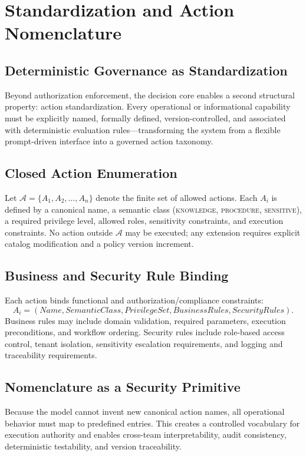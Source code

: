 \documentclass[conference]{IEEEtran}
\begin{document}
\section{Standardization and Action Nomenclature}
\label{sec:standard}

\subsection{Deterministic Governance as Standardization}
Beyond authorization enforcement, the decision core enables a second
structural property: action standardization. Every operational or
informational capability must be explicitly named, formally defined,
version-controlled, and associated with deterministic evaluation
rules---transforming the system from a flexible prompt-driven interface
into a governed action taxonomy.

\subsection{Closed Action Enumeration}
Let $\mathcal{A} = \{A_1, A_2, \dots, A_n\}$ denote the finite set of
allowed actions. Each $A_i$ is defined by a canonical name, a semantic
class (\textsc{knowledge}, \textsc{procedure}, \textsc{sensitive}), a
required privilege level, allowed roles, sensitivity constraints, and
execution constraints. No action outside $\mathcal{A}$ may be executed; any
extension requires explicit catalog modification and a policy version
increment.

\subsection{Business and Security Rule Binding}
Each action binds functional and authorization/compliance constraints:
\[
A_i = (\mathit{Name}, \mathit{SemanticClass}, \mathit{PrivilegeSet},
\mathit{BusinessRules}, \mathit{SecurityRules}).
\]
Business rules may include domain validation, required parameters,
execution preconditions, and workflow ordering. Security rules include
role-based access control, tenant isolation, sensitivity escalation
requirements, and logging and traceability requirements.

\subsection{Nomenclature as a Security Primitive}
Because the model cannot invent new canonical action names, all
operational behavior must map to predefined entries. This creates a
controlled vocabulary for execution authority and enables cross-team
interpretability, audit consistency, deterministic testability, and
version traceability.
\end{document}
